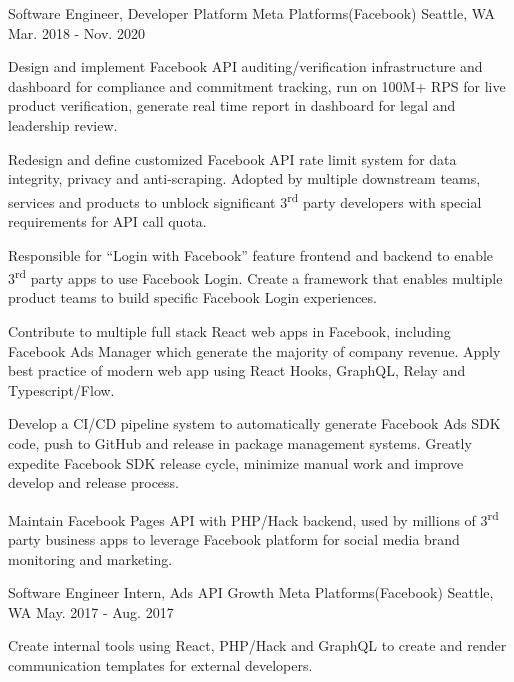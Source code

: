 \begin{cventries}
	\cventry
	{Software Engineer, Developer Platform} %
	{Meta Platforms(Facebook)} %
	{Seattle, WA} %
	{Mar. 2018 - Nov. 2020} %
	{
		\begin{cvitems}
			\item Design and implement Facebook API auditing/verification infrastructure and dashboard for compliance and commitment tracking, run on 100M+ RPS for live product verification, generate real time report in dashboard for legal and leadership review. %
			\item Redesign and define customized Facebook API rate limit system for data integrity, privacy and anti-scraping. Adopted by multiple downstream teams, services and products to unblock significant 3\textsuperscript{rd} party developers with special requirements for API call quota. %
			\item{Responsible for ``Login with Facebook'' feature frontend and backend to enable 3\textsuperscript{rd} party apps to use Facebook Login. Create a framework that enables multiple product teams to build specific Facebook Login experiences.} %
			\item Contribute to multiple full stack React web apps in Facebook, including Facebook Ads Manager which generate the majority of company revenue. Apply best practice of modern web app using React Hooks, GraphQL, Relay and Typescript/Flow. %
			\item Develop a CI/CD pipeline system to automatically generate Facebook Ads SDK code, push to GitHub and release in package management systems. Greatly expedite Facebook SDK release cycle, minimize manual work and improve develop and release process. %
			\item Maintain Facebook Pages API with PHP/Hack backend, used by millions of 3\textsuperscript{rd} party business apps to leverage Facebook platform for social media brand monitoring and marketing. %
		\end{cvitems}
	}




	\cventry
	{Software Engineer Intern, Ads API Growth} %
	{Meta Platforms(Facebook)} %
	{Seattle, WA} %
	{May. 2017 - Aug. 2017} %
	{
		\begin{cvitems}
			\item Create internal tools using React, PHP/Hack and GraphQL to create and render communication templates for external developers.
		\end{cvitems}
	}


\end{cventries}
